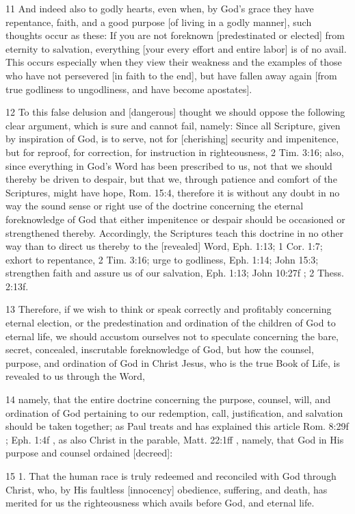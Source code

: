 {11 And indeed also to godly hearts, even when, by God’s grace they have repentance, faith, and a good purpose [of living in a godly manner], such thoughts occur as these: If you are not foreknown [predestinated or elected] from eternity to salvation, everything [your every effort and entire labor] is of no avail. This occurs especially when they view their weakness and the examples of those who have not persevered [in faith to the end], but have fallen away again [from true godliness to ungodliness, and have become apostates].

12 To this false delusion and [dangerous] thought we should oppose the following clear argument, which is sure and cannot fail, namely: Since all Scripture, given by inspiration of God, is to serve, not for [cherishing] security and impenitence, but for reproof, for correction, for instruction in righteousness, 2 Tim. 3:16; also, since everything in God’s Word has been prescribed to us, not that we should thereby be driven to despair, but that we, through patience and comfort of the Scriptures, might have hope, Rom. 15:4, therefore it is without any doubt in no way the sound sense or right use of the doctrine concerning the eternal foreknowledge of God that either impenitence or despair should be occasioned or strengthened thereby. Accordingly, the Scriptures teach this doctrine in no other way than to direct us thereby to the [revealed] Word, Eph. 1:13; 1 Cor. 1:7; exhort to repentance, 2 Tim. 3:16; urge to godliness, Eph. 1:14; John 15:3; strengthen faith and assure us of our salvation, Eph. 1:13; John 10:27f ; 2 Thess. 2:13f.

13 Therefore, if we wish to think or speak correctly and profitably concerning eternal election, or the predestination and ordination of the children of God to eternal life, we should accustom ourselves not to speculate concerning the bare, secret, concealed, inscrutable foreknowledge of God, but how the counsel, purpose, and ordination of God in Christ Jesus, who is the true Book of Life, is revealed to us through the Word,

14 namely, that the entire doctrine concerning the purpose, counsel, will, and ordination of God pertaining to our redemption, call, justification, and salvation should be taken together; as Paul treats and has explained this article Rom. 8:29f ; Eph. 1:4f , as also Christ in the parable, Matt. 22:1ff , namely, that God in His purpose and counsel ordained [decreed]:

15 1. That the human race is truly redeemed and reconciled with God through Christ, who, by His faultless [innocency] obedience, suffering, and death, has merited for us the righteousness which avails before God, and eternal life.

}
